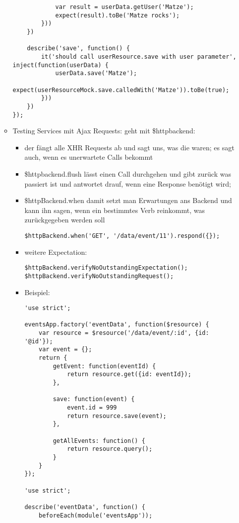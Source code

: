 \begin{itemize}
\begin{itemize}
\begin{verbatim}
            var result = userData.getUser('Matze');
            expect(result).toBe('Matze rocks');
        }))
    })

    describe('save', function() {
        it('should call userResource.save with user parameter', inject(function(userData) {
            userData.save('Matze');
            expect(userResourceMock.save.calledWith('Matze')).toBe(true);
        }))
    })
});
        \end{verbatim}
			\item Testing Services mit Ajax Requests: geht mit \$httpbackend:
        \begin{itemize}
          \item der fängt alle XHR Requests ab und sagt uns, was die waren; es sagt auch, wenn es unerwartete Calls bekommt
          \item  \$httpbackend.flush lässt einen Call durchgehen und gibt zurück was passiert ist und antwortet drauf, wenn eine Response benötigt wird;
          \item \$httpBackend.when damit setzt man Erwartungen ans Backend und kann ihn sagen, wenn ein bestimmtes Verb reinkommt, was zurückgegeben werden soll
            \begin{verbatim}
$httpBackend.when('GET', '/data/event/11').respond({});
            \end{verbatim}
          \item weitere Expectation:
            \begin{verbatim}
$httpBackend.verifyNoOutstandingExpectation();
$httpBackend.verifyNoOutstandingRequest();
            \end{verbatim}
          \item Beispiel:
            \begin{verbatim}
'use strict';

eventsApp.factory('eventData', function($resource) {
    var resource = $resource('/data/event/:id', {id: '@id'});
    var event = {};
    return {
        getEvent: function(eventId) {
            return resource.get({id: eventId});
        },

        save: function(event) {
            event.id = 999
            return resource.save(event);
        },

        getAllEvents: function() {
            return resource.query();
        }
    }
});

'use strict';

describe('eventData', function() {
    beforeEach(module('eventsApp'));


\end{verbatim}
\end{itemize}
\end{itemize}
\end{itemize}
